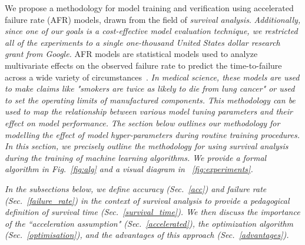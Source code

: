 \documentclass[conference]{IEEEtran}
\newcommand{\cm}[1]{\textit{{\color{blue}#1}}}
\begin{document}
We propose a methodology for model training and verification using accelerated failure rate (AFR) models, drawn from the field of \textit{survival analysis}. \cm{Additionally, since one of our goals is a cost-effective model evaluation technique, we restricted all of the experiments to a single one-thousand United States dollar research grant from Google.}
AFR models are statistical models used to analyze multivariate effects on the observed failure rate to predict the time-to-failure across a wide variety of circumstances~\cite{aft_models,kleinbaum1996survival}. \cm{In medical science, these models are used to make claims like "smokers are twice as likely to die from lung cancer" or used to set the operating limits of manufactured components. This methodology can be used to map the relationship between various model tuning parameters and their effect on model performance.}
\cm{The section below outlines our methodology for modelling the effect of model hyper-parameters during routine training procedures. In this section, we precisely outline the methodology for using survival analysis during the training of machine learning algorithms. We provide a formal algorithm in Fig.~\ref{fig:alg} and a visual diagram in ~\ref{fig:experiments}.}


\cm{In the subsections below, we define accuracy (Sec.~\ref{acc}) and failure rate (Sec.~\ref{failure_rate})  in the context of survival analysis to provide a pedagogical definition of survival time (Sec.~\ref{survival_time}). We then discuss the importance of the ``acceleration assumption" (Sec.~\ref{accelerated}), the optimization algorithm (Sec.~\ref{optimisation}), and the advantages of this approach (Sec.~\ref{advantages}).}
\end{document}

